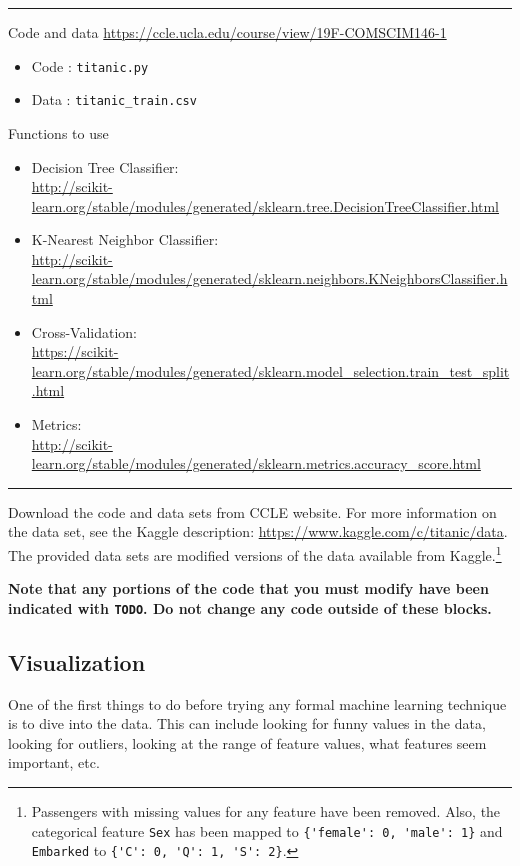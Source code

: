 \vspace{-\baselineskip}
\rule{\textwidth}{1pt}
Code and data \url{https://ccle.ucla.edu/course/view/19F-COMSCIM146-1}
\begin{itemize}[nolistsep]
\item Code : \verb|titanic.py|
\item Data : \verb|titanic_train.csv|
\end{itemize}
Functions to use
\begin{itemize}[nolistsep]
\item Decision Tree Classifier: \\{\footnotesize \url{http://scikit-learn.org/stable/modules/generated/sklearn.tree.DecisionTreeClassifier.html}}
\item K-Nearest Neighbor Classifier: \\{\footnotesize \url{http://scikit-learn.org/stable/modules/generated/sklearn.neighbors.KNeighborsClassifier.html}} 
\item Cross-Validation: \\{\footnotesize \url{https://scikit-learn.org/stable/modules/generated/sklearn.model_selection.train_test_split.html}}
\item Metrics: \\{\footnotesize \url{http://scikit-learn.org/stable/modules/generated/sklearn.metrics.accuracy_score.html}}
\end{itemize}
\vspace{-\baselineskip}
\rule{\textwidth}{1pt}

Download the code and data sets from CCLE website. For more information on the data set, see the Kaggle description: \url{https://www.kaggle.com/c/titanic/data}. The provided data sets are modified versions of the data available from Kaggle.\footnote{Passengers with missing values for any feature have been removed. Also, the categorical feature \verb|Sex| has been mapped to \verb|{'female': 0, 'male': 1}| and \verb|Embarked| to \verb|{'C': 0, 'Q': 1, 'S': 2}|.}

{\bf Note that any portions of the code that you must modify have been indicated with \verb|TODO|. Do not change any code outside of these blocks.}


\subsection{Visualization }

One of the first things to do before trying any formal machine learning technique is to dive into the data. This can include looking for funny values in the data, looking for outliers, looking at the range of feature values, what features seem important, etc.

